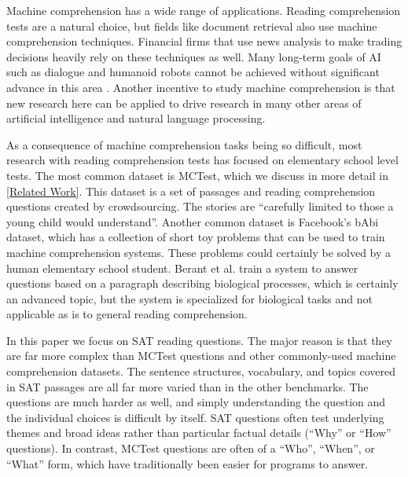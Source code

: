 \documentclass[pageno]{jpaper}
\begin{document}
Machine comprehension has a wide range of applications. Reading comprehension
tests are a natural choice, but fields like document retrieval also use machine
comprehension techniques. Financial firms that use news analysis to make
trading decisions heavily rely on these techniques as well. Many long-term
goals of AI such as dialogue and humanoid robots cannot be achieved without
significant advance in this area \cite{Weston2015}. Another incentive to
study machine comprehension is that new research here can be applied to drive
research in many other areas of artificial intelligence and natural language
processing.

As a consequence of machine comprehension tasks being so difficult, most
research with reading comprehension tests has focused on elementary school
level tests. The most common dataset is MCTest\cite{Richardson2013}, which we
discuss in more detail in \ref{Related Work}. This dataset is a set of passages
and reading comprehension questions created by crowdsourcing. The stories are
``carefully limited to those a young child would
understand''\cite{Richardson2013}. Another common dataset is Facebook's bAbi
dataset\cite{Weston2015}, which has a collection of short toy problems that can
be used to train machine comprehension systems. These problems could certainly
be solved by a human elementary school student. Berant et al.\cite{Berant2014}
train a system to answer questions based on a paragraph describing biological
processes, which is certainly an advanced topic, but the system is specialized
for biological tasks and not applicable as is to general reading comprehension.

In this paper we focus on SAT reading questions. The major reason is that they
are far more complex than MCTest questions and other commonly-used machine
comprehension datasets. The sentence structures, vocabulary, and topics covered
in SAT passages are all far more varied than in the other benchmarks. The
questions are much harder as well, and simply understanding the question and the
individual choices is difficult by itself. SAT questions often test underlying
themes and broad ideas rather than particular factual details (``Why'' or
``How'' questions). In contrast, MCTest questions are often of a ``Who'',
``When'', or ``What'' form, which have traditionally been easier for programs to
answer.
\end{document}
